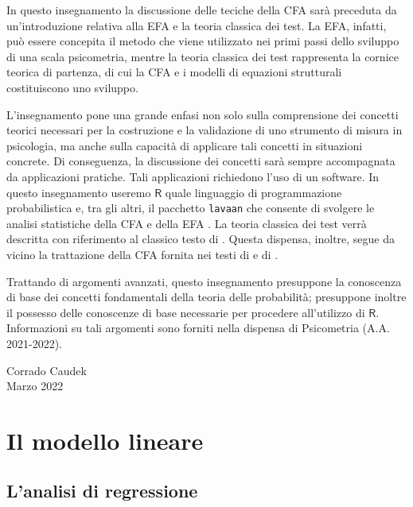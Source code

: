 \documentclass[
  11pt,
]{krantz}
\begin{document}
In questo insegnamento la discussione delle teciche della CFA sarà preceduta da un'introduzione relativa alla EFA e la teoria classica dei test. La EFA, infatti, può essere concepita il metodo che viene utilizzato nei primi passi dello sviluppo di una scala psicometria, mentre la teoria classica dei test rappresenta la cornice teorica di partenza, di cui la CFA e i modelli di equazioni strutturali costituiscono uno sviluppo.

L'insegnamento pone una grande enfasi non solo sulla comprensione dei concetti teorici necessari per la costruzione e la validazione di uno strumento di misura in psicologia, ma anche sulla capacità di applicare tali concetti in situazioni concrete. Di conseguenza, la discussione dei concetti sarà sempre accompagnata da applicazioni pratiche. Tali applicazioni richiedono l'uso di un software. In questo insegnamento useremo \(\textsf{R}\) \citep{rmanual} quale linguaggio di programmazione probabilistica e, tra gli altri, il pacchetto \texttt{lavaan} che consente di svolgere le analisi statistiche della CFA e della EFA \citep{beaujean2014latent}. La teoria classica dei test verrà descritta con riferimento al classico testo di \citet{lord1968statistical}. Questa dispensa, inoltre, segue da vicino la trattazione della CFA fornita nei testi di \citet{mcdonald2013test} e di \citet{brown2015confirmatory}.

Trattando di argomenti avanzati, questo insegnamento presuppone la conoscenza di base dei concetti fondamentali della teoria delle probabilità; presuppone inoltre il possesso delle conoscenze di base necessarie per procedere all'utilizzo di \(\textsf{R}\). Informazioni su tali argomenti sono forniti nella dispensa di Psicometria (A.A. 2021-2022).

\begin{flushright}
Corrado Caudek\\
Marzo 2022 \end{flushright}

\mainmatter

\hypertarget{part-il-modello-lineare}{%
\part{Il modello lineare}\label{part-il-modello-lineare}}

\hypertarget{lanalisi-di-regressione}{%
\chapter{L'analisi di regressione}\label{lanalisi-di-regressione}}
\end{document}

